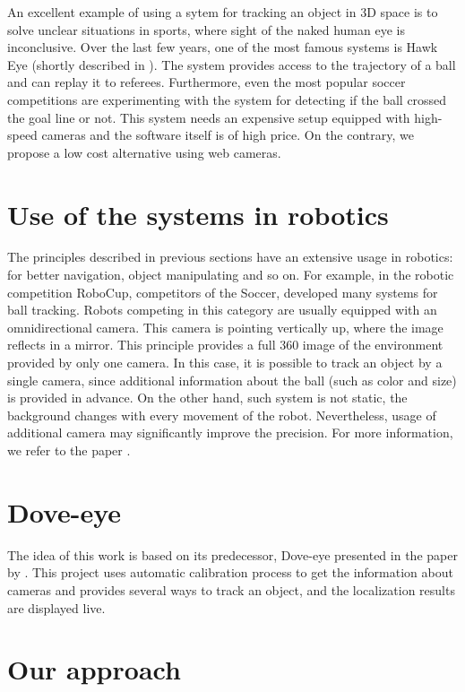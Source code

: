 An excellent example of using a sytem for tracking an object in 3D space
is to solve unclear situations in sports, where sight of the naked human
eye is inconclusive. Over the last few years, one of the most famous systems is
Hawk Eye (shortly described in \citet*{owens2003hawk}). The system provides
access to the trajectory of a ball and can replay it to referees.
Furthermore, even the most popular soccer competitions are experimenting with
the system for detecting if the ball crossed the goal line or not.  This system needs
an expensive setup equipped with high-speed cameras and the software itself is of
high price. On the contrary, we propose a low cost alternative using web cameras.

\section{Use of the systems in robotics}

The principles described in previous sections have an extensive usage in
robotics: for better navigation, object manipulating and so on. For example, in
the robotic competition RoboCup, competitors of the Soccer, developed
many systems for ball tracking. Robots competing in this category are usually
equipped with an omnidirectional camera.  This camera is pointing vertically
up, where the image reflects in a mirror.  This principle provides a full
360\degree{} image of the environment provided by only one camera. In this case,
it is possible to track an object by a single camera, since additional
information about the ball (such as color and size) is provided in advance. On
the other hand, such system is not static, the background changes with every
movement of the robot. Nevertheless, usage of additional camera may
significantly improve the precision. For more information, we refer to
the paper \citet*{kappeler20103d}.


\section{Dove-eye}

The idea of this work is based on its predecessor, Dove-eye presented in the
paper by \citet*{dove-eye}. This project uses automatic calibration process to
get the information about cameras and provides several ways to track an
object, and  the localization results are displayed live.

\section{Our approach}

